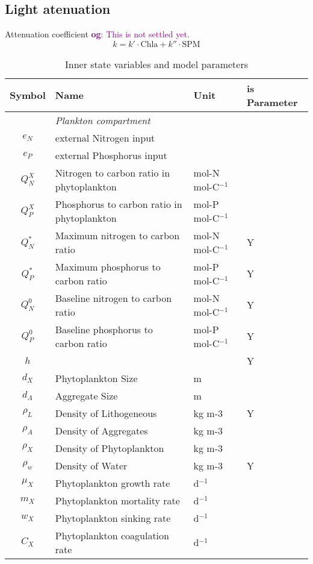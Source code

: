 \documentclass[fleqn]{article}                     %
\newcommand{\comment}[3][darkmagenta]{\textcolor{#1}{\textbf{#2}: #3}}
\begin{document}
\subsection{Light atenuation}
Attenuation coefficient
\comment{og}{This is not settled yet.}
\begin{equation}
  k = k'\cdot \textrm{Chla} + k'' \cdot \textrm{SPM}
\end{equation}

\begin{table*}[h]
  \centering
  \caption{Inner state variables and model parameters}
  \begin{tabular}{clll}
  \hline
    \textbf{Symbol} & \textbf{Name} & \textbf{Unit}& is Parameter \\ \hline
    & \emph{Plankton compartment} & \\
    $e_N$ & external Nitrogen input\\
    $e_P$ & external Phosphorus input \\
    $Q^X_N$ & Nitrogen to carbon ratio in phytoplankton & mol-N mol-C$^{-1}$ \\
    $Q^X_P$ & Phosphorus to carbon ratio in phytoplankton & mol-P mol-C$^{-1}$ \\
    $Q^*_N$ & Maximum nitrogen to carbon ratio & mol-N mol-C$^{-1}$ &Y\\
    $Q^*_P$ & Maximum phosphorus to carbon ratio & mol-P mol-C$^{-1}$ &Y\\
    $Q^0_N$ & Baseline nitrogen to carbon ratio & mol-N mol-C$^{-1}$ &Y\\
    $Q^0_P$ & Baseline phosphorus to carbon ratio & mol-P mol-C$^{-1}$ &Y\\
    $h$ & &&Y\\
    $d_X$&Phytoplankton Size& m &\\
    $d_A$&Aggregate Size& m &\\
    $\rho_L$& Density of Lithogeneous & kg m-3 & Y\\
    $\rho_A$& Density of Aggregates & kg m-3&\\
    $\rho_X$& Density of Phytoplankton & kg m-3 &\\
    $\rho_w$&Density of Water & kg m-3&Y\\
    $\mu_X$ & Phytoplankton growth rate & d$^{-1}$ \\
    $m_X$ & Phytoplankton mortality rate & d$^{-1}$ \\
    $w_X$ & Phytoplankton sinking rate & d$^{-1}$ \\
    $C_X$ & Phytoplankton coagulation rate & d$^{-1}$ \\

\end{tabular}
\end{table*}
\end{document}
